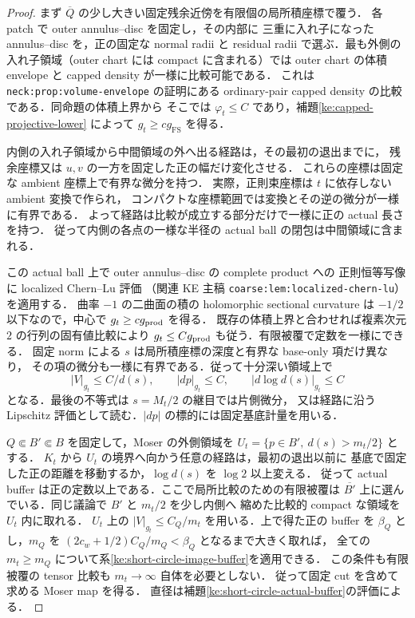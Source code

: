 \begin{proof}
まず $\overline Q$ の少し大きい固定残余近傍を有限個の局所積座標で覆う．
各 patch で outer annulus--disc を固定し，その内部に
三重に入れ子になった annulus--disc を，正の固定な normal radii と residual radii
で選ぶ．最も外側の入れ子領域（outer chart には compact に含まれる）では
outer chart の体積 envelope と capped density が一様に比較可能である．
これは \texttt{neck:prop:volume-envelope} の証明にある
ordinary-pair capped density の比較である．同命題の体積上界から
そこでは $\varphi_t\le C$ であり，補題\ref{ke:capped-projective-lower}
によって $g_t\ge c g_{\mathrm{FS}}$ を得る．

内側の入れ子領域から中間領域の外へ出る経路は，その最初の退出までに，
残余座標又は $u,v$ の一方を固定した正の幅だけ変化させる．
これらの座標は固定な ambient 座標上で有界な微分を持つ．
実際，正則束座標は $t$ に依存しない ambient 変換で作られ，
コンパクトな座標範囲では変換とその逆の微分が一様に有界である．
よって経路は比較が成立する部分だけで一様に正の actual 長さを持つ．
従って内側の各点の一様な半径の actual ball の閉包は中間領域に含まれる．

この actual ball 上で outer annulus--disc の complete product への
正則恒等写像に localized Chern--Lu 評価
（関連 KE 主稿 \texttt{coarse:lem:localized-chern-lu}）を適用する．
曲率 $-1$ の二曲面の積の holomorphic sectional curvature は
$-1/2$ 以下なので，中心で $g_t\ge c g_{\rm prod}$ を得る．
既存の体積上界と合わせれば複素次元 $2$ の行列の固有値比較により
$g_t\le C g_{\rm prod}$ も従う．有限被覆で定数を一様にできる．
固定 norm による $s$ は局所積座標の深度と有界な base-only 項だけ異なり，
その項の微分も一様に有界である．従って十分深い領域上で
\[
 |V|_{g_t}\le C/d(s),\qquad
 |dp|_{g_t}\le C,\qquad
 |d\log d(s)|_{g_t}\le C
\]
となる．最後の不等式は $s=M_t/2$ の継目では片側微分，
又は経路に沿う Lipschitz 評価として読む．$|dp|$ の標的には固定基底計量を用いる．

$Q\Subset B'\Subset B$ を固定して，Moser の外側領域を
$U_t=\{p\in B',\ d(s)>m_t/2\}$ とする．
$K_t$ から $U_t$ の境界へ向かう任意の経路は，最初の退出以前に
基底で固定した正の距離を移動するか，$\log d(s)$ を $\log 2$ 以上変える．
従って actual buffer は正の定数以上である．ここで局所比較のための有限被覆は
$\overline{B'}$ 上に選んでいる．同じ議論で $B'$ と $m_t/2$ を少し内側へ
縮めた比較的 compact な領域を $U_t$ 内に取れる．
$U_t$ 上の $|V|_{g_t}\le C_Q/m_t$ を用いる．上で得た正の buffer を
$\beta_Q$ とし，$m_Q$ を
$(2c_w+1/2)C_Q/m_Q<\beta_Q$ となるまで大きく取れば，
全ての $m_t\ge m_Q$ について系\ref{ke:short-circle-image-buffer}を適用できる．
この条件も有限被覆の tensor 比較も $m_t\to\infty$ 自体を必要としない．
従って固定 cut を含めて求める Moser map を得る．
直径は補題\ref{ke:short-circle-actual-buffer}の評価による．
\end{proof}

